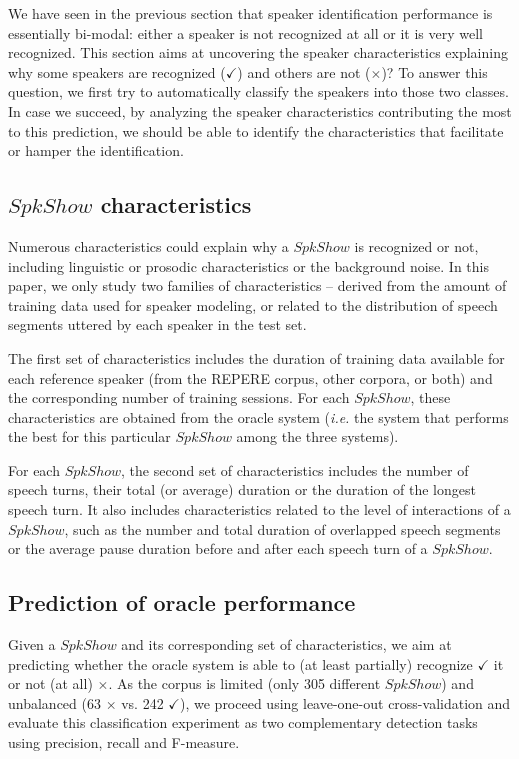 We have seen in the previous section that speaker identification performance is essentially bi-modal: either a speaker is not recognized at all or it is very well recognized. This section aims at uncovering the speaker characteristics explaining why some speakers are recognized ($\checkmark$) and others are not ($\times$)? To answer this question, we first try to automatically classify the speakers into those two classes. In case we succeed, by analyzing the speaker characteristics contributing the most to this prediction, we should be able to identify the characteristics that facilitate or hamper the identification.

\subsection{$SpkShow$ characteristics}

Numerous characteristics could explain why a $SpkShow$ is recognized or not, including linguistic or prosodic characteristics or the background noise. In this paper, we only study two families of characteristics -- derived from the amount of training data used for speaker modeling, or related to the distribution of speech segments uttered by each speaker in the test set. 

The first set of characteristics includes the duration of training data available for each reference speaker (from the REPERE corpus, other corpora, or both) and the corresponding number of training sessions. For each $SpkShow$, these characteristics are obtained from the oracle system (\emph{i.e.} the system that performs the best for this particular $SpkShow$ among the three systems).

For each $SpkShow$, the second set of characteristics includes the number of speech turns, their total (or average) duration or the duration of the longest speech turn. It also includes characteristics related to the level of interactions of a $SpkShow$, such as the number and total duration of overlapped speech segments or the average pause duration before and after each speech turn of a $SpkShow$.

\subsection{Prediction of oracle performance}

Given a $SpkShow$ and its corresponding set of characteristics, we aim at predicting whether the oracle system is able to (at least partially) recognize $\checkmark$ it or not (at all) $\times$. 
As the corpus is limited (only 305 different $SpkShow$) and unbalanced (63 $\times$ vs. 242 $\checkmark$), we proceed using leave-one-out cross-validation and evaluate this classification experiment as two complementary detection tasks using precision, recall and F-measure.

